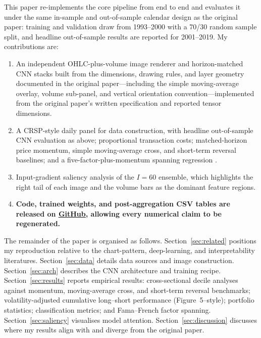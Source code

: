 \documentclass{article}
\begin{document}
This paper re-implements the core pipeline from end to end and evaluates it
under the same in-sample and out-of-sample calendar design as
the original paper: training and validation draw from 1993--2000
with a 70/30 random sample split, and headline out-of-sample results are
reported for 2001--2019. My contributions are:
\begin{enumerate}
  \item An independent OHLC-plus-volume image renderer and horizon-matched CNN
        stacks built from the dimensions, drawing rules, and layer geometry
        documented in the original paper---including the simple
        moving-average overlay, volume sub-panel, and vertical orientation
        convention---implemented from the original paper's written specification and
        reported tensor dimensions.
  \item A CRSP-style daily panel for data construction, with headline
        out-of-sample CNN evaluation as above; proportional transaction
        costs; matched-horizon price momentum, simple moving-average cross,
        and short-term reversal baselines; and a five-factor-plus-momentum
        spanning regression \citep{fama1993common,fama2015five,carhart1997persistence}.
  \item Input-gradient saliency analysis \citep{simonyan2014deep} of the
        $I=60$ ensemble, which highlights the right tail of each image and
        the volume bars as the dominant feature regions.
  \item \textbf{Code, trained weights, and post-aggregation CSV tables are released
        on \href{https://github.com/George-hardworking/machine-learning-for-finance/tree/main/final_submit_version}{\underline{GitHub}},
        allowing every numerical claim to be regenerated.}
\end{enumerate}

The remainder of the paper is organised as follows. Section~\ref{sec:related}
positions my reproduction relative to the chart-pattern, deep-learning, and
interpretability literatures. Section~\ref{sec:data} details data sources and
image construction. Section~\ref{sec:arch} describes the CNN architecture and
training recipe. Section~\ref{sec:results} reports empirical results:
cross-sectional decile analyses against momentum, moving-average cross,
and short-term reversal benchmarks; volatility-adjusted cumulative long--short
performance (Figure~5--style); portfolio
statistics; classification metrics; and Fama--French factor spanning.
Section~\ref{sec:saliency} visualises model
attention. Section~\ref{sec:discussion} discusses where my results align
with and diverge from the original paper.
\end{document}
